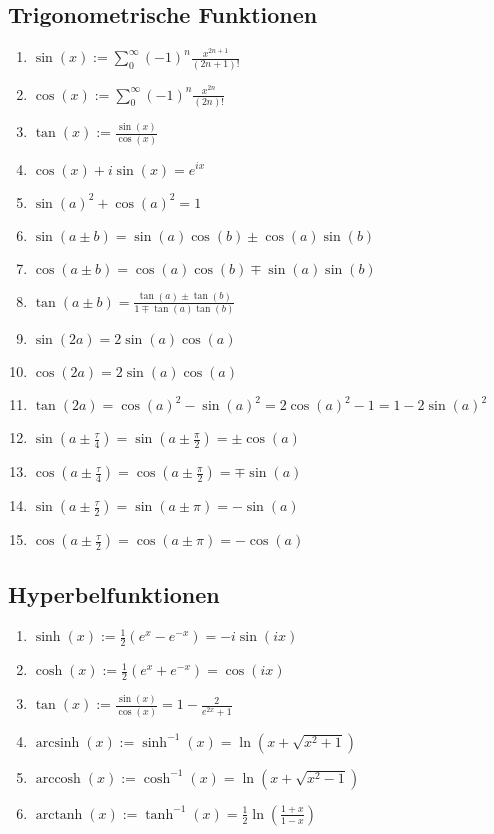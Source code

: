 \documentclass[a4paper, 9pt, DIV=24]{scrartcl}
\DeclareMathOperator{\arcsinh}{arcsinh}
\DeclareMathOperator{\arccosh}{arccosh}
\DeclareMathOperator{\arctanh}{arctanh}
\begin{document}
\subsection{Trigonometrische Funktionen}
\begin{enumerate}[label={(}\arabic*{)}]
 \item $\sin(x) := \sum_0^\infty (-1)^n\frac{x^{2n+1}}{(2n+1)!}$
 \item $\cos(x) := \sum_0^\infty (-1)^n\frac{x^{2n}}{(2n)!}$
 \item $\tan(x) := \frac{\sin(x)}{\cos(x)}$
 \item $\cos(x) + i\sin(x) = e^{ix}$
 \item $\sin(a)^2 + \cos(a)^2 = 1$
 \item $\sin(a \pm b) = \sin(a)\cos(b) \pm \cos(a)\sin(b)$
 \item $\cos(a \pm b) = \cos(a)\cos(b) \mp \sin(a)\sin(b)$
 \item $\tan(a \pm b) = \frac{\tan(a)\pm\tan(b)}{1\mp\tan(a)\tan(b)}$
 \item $\sin(2a) = 2\sin(a)\cos(a)$
 \item $\cos(2a) = 2\sin(a)\cos(a)$
 \item $\tan(2a) = \cos(a)^2 - \sin(a)^2 = 2\cos(a)^2 - 1 = 1 - 2\sin(a)^2$
 \item $\sin(a \pm \frac{\tau}{4}) = \sin(a\pm\frac{\pi}{2}) = \pm\cos(a)$
 \item $\cos(a \pm \frac{\tau}{4}) = \cos(a\pm\frac{\pi}{2}) = \mp\sin(a)$
 \item $\sin(a \pm \frac{\tau}{2}) = \sin(a\pm\pi) = -\sin(a)$
 \item $\cos(a \pm \frac{\tau}{2}) = \cos(a\pm\pi) = -\cos(a)$
\end{enumerate}
\subsection{Hyperbelfunktionen}
\begin{enumerate}[label={(}\arabic*{)}]
 \item $\sinh(x) := \frac{1}{2}(e^x-e^{-x}) = -i\sin(ix)$
 \item $\cosh(x) := \frac{1}{2}(e^x+e^{-x}) = \cos(ix)$
 \item $\tan(x) := \frac{\sin(x)}{\cos(x)} = 1 - \frac{2}{e^{2x}+1}$
 \item $\arcsinh(x) := \sinh^{-1}(x) = \ln(x + \sqrt{x^2+1})$
 \item $\arccosh(x) := \cosh^{-1}(x) = \ln(x + \sqrt{x^2-1})$
 \item $\arctanh(x) := \tanh^{-1}(x) = \frac{1}{2}\ln(\frac{1+x}{1-x})$
\end{enumerate}
\end{document}
